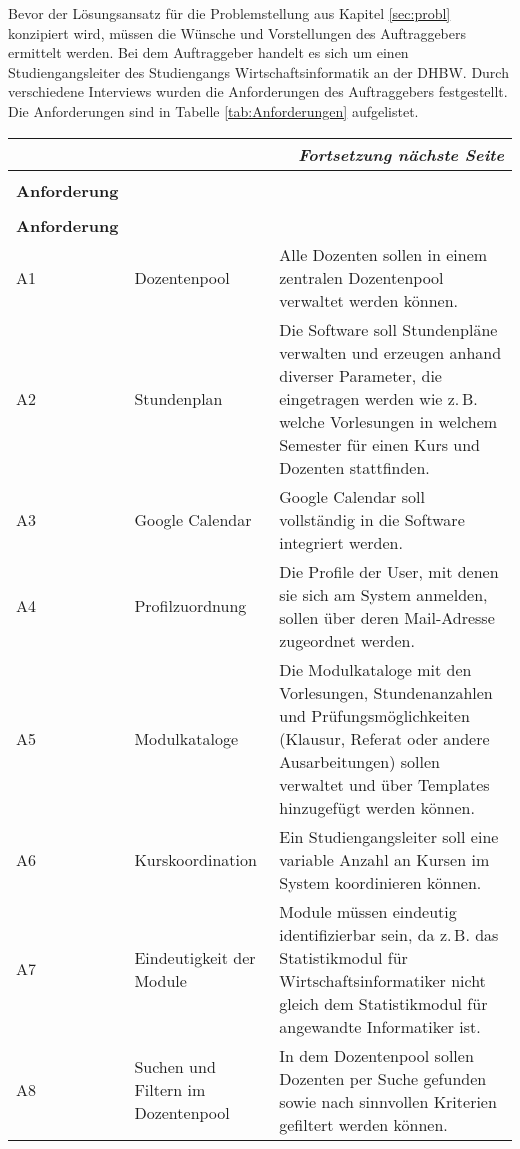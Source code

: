 Bevor der Lösungsansatz für die Problemstellung aus Kapitel \vref{sec:probl} konzipiert wird, müssen die Wünsche und Vorstellungen des Auftraggebers ermittelt werden. Bei dem Auftraggeber handelt es sich um einen Studiengangsleiter   des Studiengangs Wirtschaftsinformatik an der \acs{DHBW}. Durch verschiedene Interviews wurden die Anforderungen des Auftraggebers festgestellt. Die Anforderungen sind in Tabelle \ref{tab:Anforderungen} aufgelistet. 
\begin{longtable}[h]{|p{}|p{4cm}|p{}|}		
	\multicolumn{3}{|r|}{\textit{Fortsetzung nächste Seite}} \\ \hline
	\endfoot
	\endlastfoot
	\hline &&\\[-0.5em]
	\textbf{Anforderung} & \head{Kurztitel} & \head{Beschreibung} \\ \hline
	\endfirsthead
	\hline &&\\[-0.5em]
	\textbf{Anforderung} & \head{Kurztitel} & \head{Beschreibung} \\ \hline
	\endhead
	\parbox[t]{3cm}{A1} & Dozentenpool & Alle Dozenten sollen in einem zentralen Dozentenpool verwaltet werden können.\\ \hline
	\parbox[t]{3cm}{A2} & Stundenplan & Die Software soll Stundenpläne verwalten und erzeugen anhand diverser Parameter, die eingetragen werden wie z.\,B. welche Vorlesungen in welchem Semester für einen Kurs und Dozenten stattfinden.\\ \hline
	\parbox[t]{3cm}{A3} & Google Calendar & Google Calendar soll vollständig in die Software integriert werden.\\ \hline
	\parbox[t]{3cm}{A4} & Profilzuordnung & Die Profile der User, mit denen sie sich am System anmelden, sollen über deren  Mail-Adresse zugeordnet werden.\\ \hline
	\parbox[t]{3cm}{A5} & Modulkataloge & Die Modulkataloge mit den Vorlesungen, Stundenanzahlen und Prüfungsmöglichkeiten (Klausur, Referat oder andere Ausarbeitungen) sollen verwaltet und über Templates hinzugefügt werden können.\\ \hline
	\parbox[t]{3cm}{A6} & Kurskoordination & Ein Studiengangsleiter soll eine variable Anzahl an Kursen im System koordinieren können.\\ \hline
	\parbox[t]{3cm}{A7} & Eindeutigkeit der Module & Module müssen eindeutig identifizierbar sein, da z.\,B. das Statistikmodul für Wirtschaftsinformatiker nicht gleich dem Statistikmodul für angewandte Informatiker ist.\\ \hline
	\parbox[t]{3cm}{A8} & Suchen und Filtern im Dozentenpool & In dem Dozentenpool sollen Dozenten per Suche gefunden sowie nach sinnvollen Kriterien gefiltert werden können.\\ \hline

\end{longtable}
